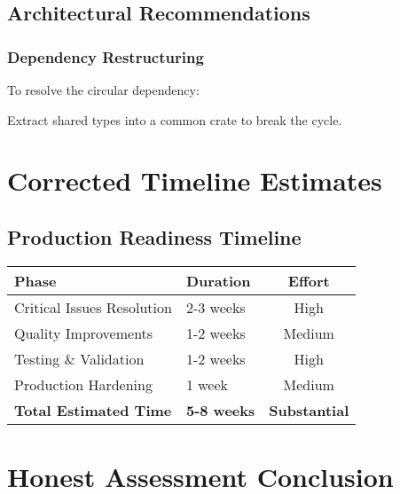 \documentclass[11pt,a4paper]{article}
\begin{document}
\subsection{Architectural Recommendations}

\subsubsection{Dependency Restructuring}
To resolve the circular dependency:

\begin{center}
\end{center}

Extract shared types into a common crate to break the cycle.

\section{Corrected Timeline Estimates}

\subsection{Production Readiness Timeline}

\begin{center}
\begin{tabular}{|l|l|c|}
\hline
\textbf{Phase} & \textbf{Duration} & \textbf{Effort} \\
\hline
Critical Issues Resolution & 2-3 weeks & High \\
Quality Improvements & 1-2 weeks & Medium \\
Testing \& Validation & 1-2 weeks & High \\
Production Hardening & 1 week & Medium \\
\hline
\textbf{Total Estimated Time} & \textbf{5-8 weeks} & \textbf{Substantial} \\
\hline
\end{tabular}
\end{center}

\section{Honest Assessment Conclusion}
\end{document}
